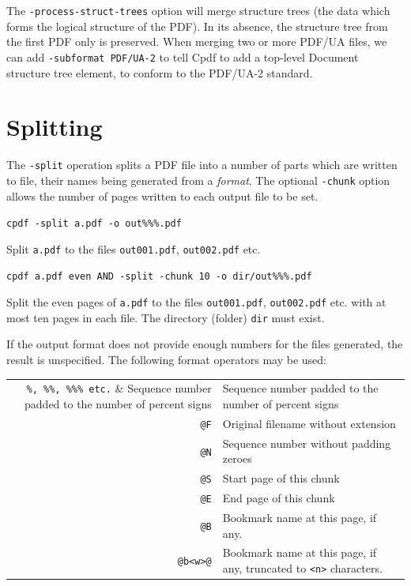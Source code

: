 \documentclass{book}
\begin{document}
The \texttt{-process-struct-trees} option will merge structure trees (the data which forms the logical structure of the PDF). In its absence, the structure tree from the first PDF only is preserved. When merging two or more PDF/UA files, we can add \texttt{-subformat PDF/UA-2} to tell Cpdf to add a top-level Document structure tree element, to conform to the PDF/UA-2 standard.

  \section{Splitting}
   The \texttt{-split} operation splits a PDF file into a number of parts which
are written to file, their names being generated from a \emph{format}. The
optional \texttt{-chunk} option allows the number of pages written to each
output file to be set. 

  \begin{framed}\small
    \noindent\verb!cpdf -split a.pdf -o out%%%.pdf!

    \vspace{2.5mm}
    \noindent Split \texttt{a.pdf} to the files \texttt{out001.pdf}, \texttt{out002.pdf} etc.

    \vspace{2.5mm}
    \noindent\verb!cpdf a.pdf even AND -split -chunk 10 -o dir/out%%%.pdf!

    \vspace{2.5mm}
    \noindent Split the even pages of \texttt{a.pdf} to the files
\texttt{out001.pdf}, \texttt{out002.pdf} etc. with at most ten pages in each
file. The directory (folder) \texttt{dir} must exist.
  \end{framed}

  \noindent If the output format does not provide enough numbers for the files generated,
the result is unspecified. The following format operators may be used:

\begin{center}
\begin{tabular}{rl}
  \verb!%, %%, %%% etc.! & Sequence number padded to the number of percent signs\\
  \texttt{@F} & Original filename without extension \\
  \texttt{@N} & Sequence number without padding zeroes \\
  \texttt{@S} & Start page of this chunk \\
  \texttt{@E} & End page of this chunk \\
  \texttt{@B} & Bookmark name at this page, if any. \\
  \texttt{@b<w>@} & Bookmark name at this page, if any, truncated to \texttt{<n>} characters.\\
\end{tabular}
\end{center}
\end{document}
